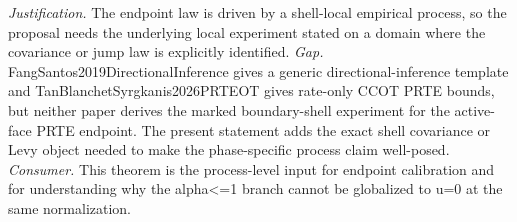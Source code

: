 \documentclass{article}
\begin{document}
\par\smallskip\noindent \textit{Justification.} The endpoint law is driven by a shell-local empirical process, so the proposal needs the underlying local experiment stated on a domain where the covariance or jump law is explicitly identified. \textit{Gap.} FangSantos2019DirectionalInference gives a generic directional-inference template and TanBlanchetSyrgkanis2026PRTEOT gives rate-only CCOT PRTE bounds, but neither paper derives the marked boundary-shell experiment for the active-face PRTE endpoint. The present statement adds the exact shell covariance or Levy object needed to make the phase-specific process claim well-posed. \textit{Consumer.} This theorem is the process-level input for endpoint calibration and for understanding why the alpha<=1 branch cannot be globalized to u=0 at the same normalization.
\end{document}

